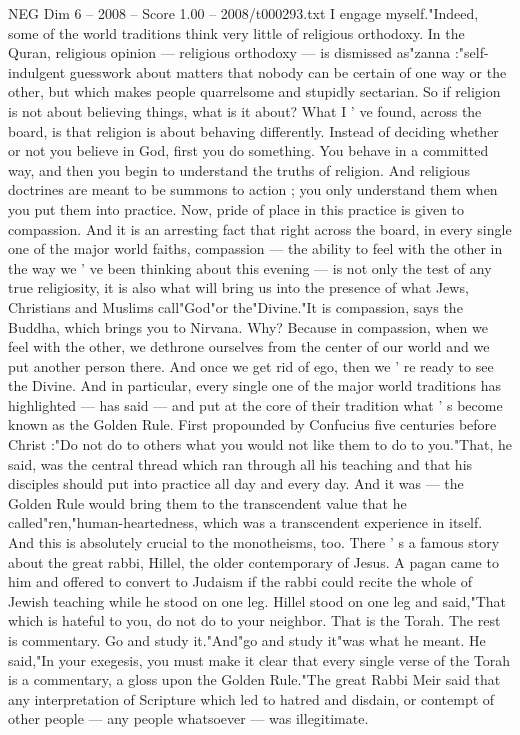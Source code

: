 \begin{textsample}{NEG Dim 6 – 2008 – Score 1.00 – 2008/t000293.txt}
I engage myself."Indeed, some of the world traditions think very little of religious orthodoxy.
In the Quran, religious opinion — religious orthodoxy — is dismissed as"zanna :"self-indulgent guesswork about matters that nobody can be certain of one way or the other, but which makes people quarrelsome and stupidly sectarian.
So if religion is not about believing things, what is it about?
What I ' ve found, across the board, is that religion is about behaving differently.
Instead of deciding whether or not you believe in God, first you do something.
You behave in a committed way, and then you begin to understand the truths of religion.
And religious doctrines are meant to be summons to action ; you only understand them when you put them into practice.
Now, pride of place in this practice is given to compassion.
And it is an arresting fact that right across the board, in every single one of the major world faiths, compassion — the ability to feel with the other in the way we ' ve been thinking about this evening — is not only the test of any true religiosity, it is also what will bring us into the presence of what Jews, Christians and Muslims call"God"or the"Divine."It is compassion, says the Buddha, which brings you to Nirvana.
Why?
Because in compassion, when we feel with the other, we dethrone ourselves from the center of our world and we put another person there.
And once we get rid of ego, then we ' re ready to see the Divine.
And in particular, every single one of the major world traditions has highlighted — has said — and put at the core of their tradition what ' s become known as the Golden Rule.
First propounded by Confucius five centuries before Christ :"Do not do to others what you would not like them to do to you."That, he said, was the central thread which ran through all his teaching and that his disciples should put into practice all day and every day.
And it was — the Golden Rule would bring them to the transcendent value that he called"ren,"human-heartedness, which was a transcendent experience in itself.
And this is absolutely crucial to the monotheisms, too.
There ' s a famous story about the great rabbi, Hillel, the older contemporary of Jesus.
A pagan came to him and offered to convert to Judaism if the rabbi could recite the whole of Jewish teaching while he stood on one leg.
Hillel stood on one leg and said,"That which is hateful to you, do not do to your neighbor.
That is the Torah.
The rest is commentary.
Go and study it."And"go and study it"was what he meant.
He said,"In your exegesis, you must make it clear that every single verse of the Torah is a commentary, a gloss upon the Golden Rule."The great Rabbi Meir said that any interpretation of Scripture which led to hatred and disdain, or contempt of other people — any people whatsoever — was illegitimate.

\end{textsample}
